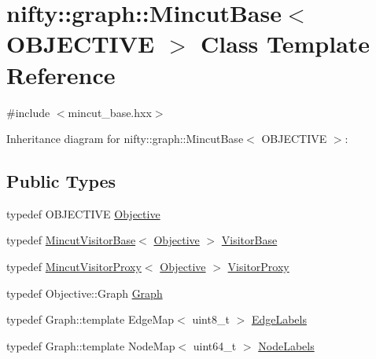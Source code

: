 \hypertarget{classnifty_1_1graph_1_1MincutBase}{}\section{nifty\+:\+:graph\+:\+:Mincut\+Base$<$ O\+B\+J\+E\+C\+T\+I\+V\+E $>$ Class Template Reference}
\label{classnifty_1_1graph_1_1MincutBase}


{\ttfamily \#include $<$mincut\+\_\+base.\+hxx$>$}



Inheritance diagram for nifty\+:\+:graph\+:\+:Mincut\+Base$<$ O\+B\+J\+E\+C\+T\+I\+V\+E $>$\+:
\subsection*{Public Types}
\begin{DoxyCompactItemize}
\item 
typedef O\+B\+J\+E\+C\+T\+I\+V\+E \hyperlink{classnifty_1_1graph_1_1MincutBase_afac19d146202da5a1d3a4aa4b89ea1fc}{Objective}
\item 
typedef \hyperlink{namespacenifty_1_1graph_abcf758110c216f393d7f20219d3fcf1b}{Mincut\+Visitor\+Base}$<$ \hyperlink{classnifty_1_1graph_1_1MincutBase_afac19d146202da5a1d3a4aa4b89ea1fc}{Objective} $>$ \hyperlink{classnifty_1_1graph_1_1MincutBase_a5ba378dc5a1fc073eb9449ca635e7648}{Visitor\+Base}
\item 
typedef \hyperlink{namespacenifty_1_1graph_ac6c35595563f4188e7cbac37871801b8}{Mincut\+Visitor\+Proxy}$<$ \hyperlink{classnifty_1_1graph_1_1MincutBase_afac19d146202da5a1d3a4aa4b89ea1fc}{Objective} $>$ \hyperlink{classnifty_1_1graph_1_1MincutBase_ae42805a72a13d7703d940675a6c90cd9}{Visitor\+Proxy}
\item 
typedef Objective\+::\+Graph \hyperlink{classnifty_1_1graph_1_1MincutBase_a777a4e1001d79f14dc4406d11320f6ff}{Graph}
\item 
typedef Graph\+::template Edge\+Map$<$ uint8\+\_\+t $>$ \hyperlink{classnifty_1_1graph_1_1MincutBase_a79320522726432c6f7e2f2b2c632683e}{Edge\+Labels}
\item 
typedef Graph\+::template Node\+Map$<$ uint64\+\_\+t $>$ \hyperlink{classnifty_1_1graph_1_1MincutBase_a9dc6555e37d38de23f194f87ca1497d5}{Node\+Labels}
\end{DoxyCompactItemize}

